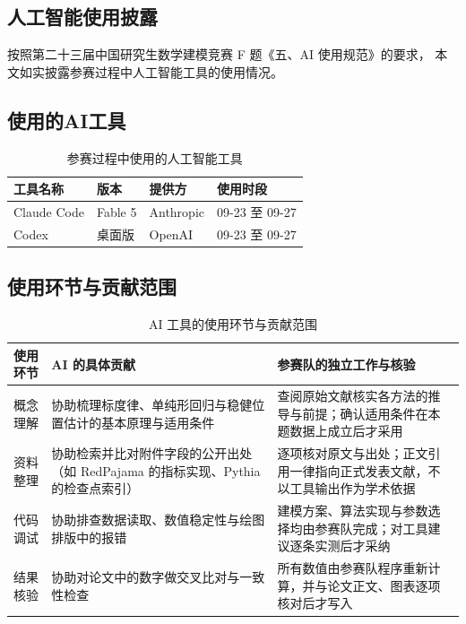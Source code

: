 \documentclass[bwprint]{gmcmthesis}
\numberwithin{equation}{section}
\numberwithin{figure}{section}
\numberwithin{table}{section}
\begin{document}
\begin{appendices}
\section{人工智能使用披露}

按照第二十三届中国研究生数学建模竞赛 F 题《五、AI 使用规范》的要求，
本文如实披露参赛过程中人工智能工具的使用情况。

\subsection{使用的AI工具}

\begin{table}[htp!]
\centering
\renewcommand\arraystretch{1.3}
\begin{tabular*}{\textwidth}{@{\extracolsep{\fill}}llll@{}}
  \toprule
  工具名称 & 版本 & 提供方 & 使用时段 \\
  \midrule
  Claude Code & Fable 5 & Anthropic & 09-23 至 09-27 \\
  Codex & 桌面版 & OpenAI & 09-23 至 09-27 \\
  \bottomrule
\end{tabular*}
\caption{参赛过程中使用的人工智能工具}
\label{tab:ai-tools}
\end{table}



\subsection{使用环节与贡献范围}

\begin{table}[htp!]
\centering
\renewcommand\arraystretch{1.3}
\begin{tabularx}{\textwidth}{lXX}
  \toprule
  使用环节 & AI 的具体贡献 & 参赛队的独立工作与核验 \\
  \midrule
  概念理解 &
  协助梳理标度律、单纯形回归与稳健位置估计的基本原理与适用条件 &
  查阅原始文献核实各方法的推导与前提；确认适用条件在本题数据上成立后才采用 \\
  资料整理 &
  协助检索并比对附件字段的公开出处（如 RedPajama 的指标实现、Pythia 的检查点索引） &
  逐项核对原文与出处；正文引用一律指向正式发表文献，不以工具输出作为学术依据 \\
  代码调试 &
  协助排查数据读取、数值稳定性与绘图排版中的报错 &
  建模方案、算法实现与参数选择均由参赛队完成；对工具建议逐条实测后才采纳 \\
  结果核验 &
  协助对论文中的数字做交叉比对与一致性检查 &
  所有数值由参赛队程序重新计算，并与论文正文、图表逐项核对后才写入 \\
  \bottomrule
\end{tabularx}
\caption{AI 工具的使用环节与贡献范围}
\label{tab:ai-usage}
\end{table}



\end{appendices}
\end{document}
